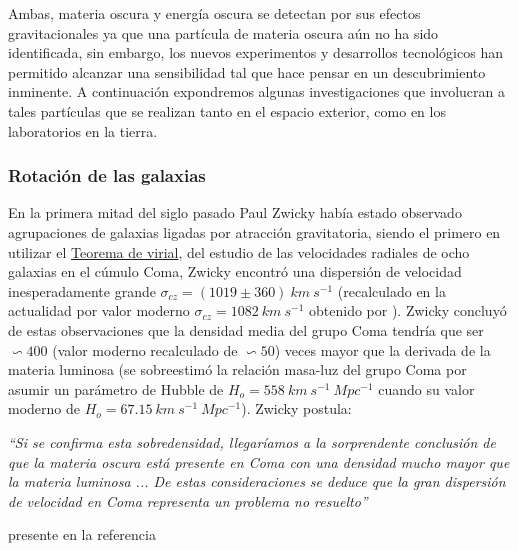 Ambas, materia oscura y energía oscura se detectan por sus efectos gravitacionales ya que una partícula de materia oscura aún no ha sido identificada, sin embargo, los nuevos experimentos y desarrollos tecnológicos han permitido alcanzar una sensibilidad tal que hace pensar en un descubrimiento inminente. A continuación expondremos algunas investigaciones que involucran a tales partículas que se realizan tanto en el espacio exterior, como en los laboratorios en la tierra.

\subsubsection{Rotación de las galaxias}
En la primera mitad del siglo pasado Paul Zwicky había estado observado agrupaciones de galaxias ligadas por atracción gravitatoria, siendo el primero en utilizar el \href{https://es.wikipedia.org/wiki/Teorema_del_virial}{Teorema de virial}, del estudio de las velocidades radiales de ocho galaxias en el cúmulo Coma, Zwicky encontró una dispersión de velocidad inesperadamente grande $\sigma_{cz} = (1019 \pm 360) ~ km ~ s^{-1}$ (recalculado en la actualidad por valor moderno $\sigma_{cz} = 1082 ~ km ~ s^{-1}$ obtenido por \cite{colless_structure_1996}). Zwicky concluyó de estas observaciones que la densidad media del grupo Coma tendría que ser $\backsim 400$ (valor moderno recalculado de $\backsim 50$) veces mayor que la derivada de la materia luminosa (se sobreestimó la relación masa-luz del grupo Coma por asumir un parámetro de Hubble de $H_o = 558 ~ km ~ s^{-1} ~Mpc^{-1}$ cuando su valor moderno de $H_o = 67.15~km~s^{-1} ~Mpc^{-1}$). Zwicky postula:

\begin{minipage}{0.9\linewidth}
\vspace{5pt}%
{\small }
\textit{``Si se confirma esta sobredensidad, llegaríamos a la sorprendente conclusión de que la materia oscura está presente en Coma con una densidad mucho mayor que la materia luminosa ... De estas consideraciones se deduce que la gran dispersión de velocidad en Coma representa un problema no resuelto''}
\begin{flushright}
presente en la referencia \cite{bergh_early_1999}
\end{flushright}
\vspace{5pt}%
\end{minipage}

